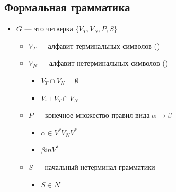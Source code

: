 \documentclass[a4paper, 14pt]{extarticle}
\begin{document}
\subsection{Формальная грамматика}
\begin{itemize}
    \item {} $G$ --- это четверка $\{V_T, V_N, P, S \}$
    \begin{itemize}
        \item $V_T$ --- алфавит терминальных символов ()
        \item $V_N$ --- алфавит нетерминальных символов ()
        \begin{itemize}
            \item $ V_T \cap V_N = \emptyset $
            \item $V :+ V_T \cap V_N$
        \end{itemize}
        \item $P$ --- конечное множество правил вида $\alpha \rightarrow \beta $
        \begin{itemize}
            \item $ \alpha \in V^* V_N V^* $
            \item $ \beta in V^* $
        \end{itemize}
        \item $S$ --- начальный нетерминал грамматики
        \begin{itemize}
            \item $ S \in N $
        \end{itemize}
    \end{itemize}
\end{itemize}
\end{document}
